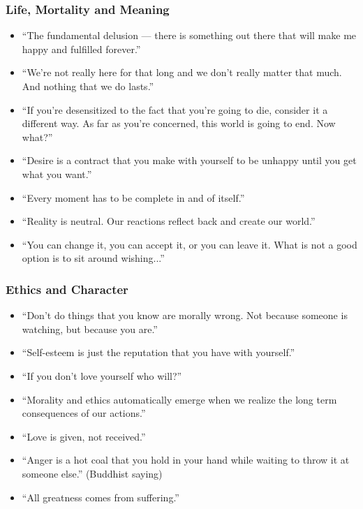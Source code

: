 \begin{frame}[fragile]\frametitle{Life, Mortality and Meaning}
      \begin{itemize}
        \item “The fundamental delusion — there is something out there that will make me happy and fulfilled forever.”
        \item “We’re not really here for that long and we don’t really matter that much. And nothing that we do lasts.”
        \item “If you’re desensitized to the fact that you’re going to die, consider it a different way. As far as you’re concerned, this world is going to end. Now what?”
        \item “Desire is a contract that you make with yourself to be unhappy until you get what you want.”
        \item “Every moment has to be complete in and of itself.”
        \item “Reality is neutral. Our reactions reflect back and create our world.”
        \item “You can change it, you can accept it, or you can leave it. What is not a good option is to sit around wishing...”
      \end{itemize}
\end{frame}
\begin{frame}[fragile]\frametitle{Ethics and Character}
      \begin{itemize}
        \item “Don’t do things that you know are morally wrong. Not because someone is watching, but because you are.”
        \item “Self-esteem is just the reputation that you have with yourself.”
        \item “If you don’t love yourself who will?”
        \item “Morality and ethics automatically emerge when we realize the long term consequences of our actions.”
        \item “Love is given, not received.”
        \item “Anger is a hot coal that you hold in your hand while waiting to throw it at someone else.” (Buddhist saying)
        \item “All greatness comes from suffering.”
      \end{itemize}
\end{frame}
